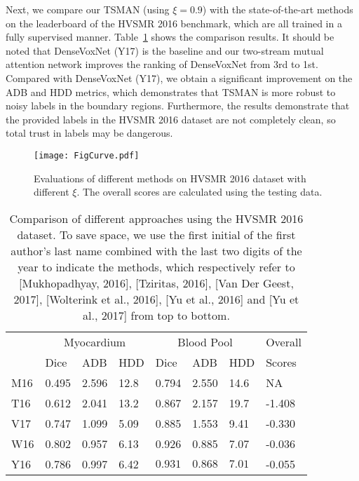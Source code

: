 \documentclass[letterpaper]{article} %
\begin{document}
Next, we compare our TSMAN (using $\xi=0.9$) with the state-of-the-art methods on the leaderboard of the HVSMR 2016 benchmark, which are all trained in a fully supervised manner.
Table~\ref{tab:fr} shows the comparison results.
It should be noted that DenseVoxNet (Y17) is the baseline and our two-stream mutual attention network improves the ranking of DenseVoxNet from 3rd to 1st.
Compared with DenseVoxNet (Y17), we obtain a significant improvement on the ADB and HDD metrics, which demonstrates that TSMAN is more robust to noisy labels in the boundary regions.
Furthermore, the results demonstrate that the provided labels in the HVSMR 2016 dataset are not completely clean, so total trust in labels may be dangerous.

\begin{figure}[t]
	\begin{center}
		\texttt{[image: FigCurve.pdf]}
	\end{center}
	\caption{Evaluations of different methods on HVSMR 2016 dataset with different $\xi$. The overall scores are calculated using the testing data.}
	\label{fig:curve}
\end{figure}\begin{table}[h]
\footnotesize
\begin{center}
\caption{Comparison of different approaches using the HVSMR 2016 dataset. To save space, we use the first initial of the first author's last name combined with the last two digits of the year to indicate the methods, which respectively refer to [Mukhopadhyay, 2016], [Tziritas, 2016], [Van Der Geest, 2017], [Wolterink et al., 2016],  [Yu et al., 2016] and [Yu et al., 2017] from top to bottom.}
\label{tab:fr}
\begin{tabular}{p{0.5cm}|p{0.7cm}|p{0.7cm}|p{0.5cm}|p{0.7cm}|p{0.7cm}|p{0.5cm}|p{0.9cm}}
  \hline
  &\multicolumn{3}{c|}{Myocardium} &\multicolumn{3}{c|}{Blood Pool}&Overall\\
  \cline{2-7}
  &Dice&ADB&HDD&Dice&ADB&HDD&Scores\\
  \hline
  M16 &0.495&2.596&12.8&0.794&2.550&14.6&NA\\
  \hline
  T16 &0.612&2.041&13.2&0.867&2.157&19.7&-1.408\\
  \hline
  V17&0.747&1.099&5.09&0.885&1.553&9.41&-0.330\\
  \hline
  W16&0.802&0.957&6.13&0.926&0.885&7.07&-0.036\\
  \hline
  Y16&0.786&0.997&6.42&$\mathbf{0.931}$&$\mathbf{0.868}$&$\mathbf{7.01}$&-0.055\\

\end{tabular}
\end{center}
\end{table}
\end{document}
